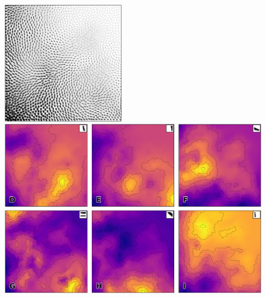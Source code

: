 \begin{figure}
  \setlength{\fboxsep}{0pt}%
  \setlength{\fboxrule}{.25pt}%

        \includegraphics[height=5.1cm]{figures/vsom-image.pdf}

  
  \vspace{2mm}

  \includegraphics[width=\textwidth]{figures/vsom-image-2.pdf}


\end{figure}
